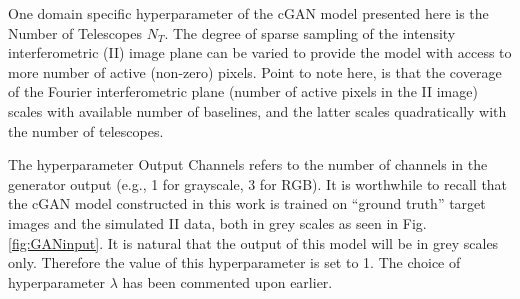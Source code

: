 One domain specific hyperparameter of the cGAN model presented here is the Number of Telescopes $N_T$. The degree of sparse sampling of the intensity interferometric (II) image plane can be varied to provide the model with access to more number of active (non-zero) pixels. Point to note here, is that the coverage of the Fourier interferometric plane (number of active pixels in the II image) scales with available number of baselines, and the latter scales quadratically with the number of telescopes.

The hyperparameter Output Channels refers to the number of channels in the generator output (e.g., 1 for grayscale, 3 for RGB). It is worthwhile to recall that the cGAN model constructed in this work is trained on ``ground truth'' target images and the simulated II data, both in grey scales as seen in Fig.\ref{fig:GANinput}. It is natural that the output of this model will be in grey scales only. Therefore the value of this hyperparameter is set to 1. The choice of hyperparameter \(\lambda\) has been commented upon earlier.

